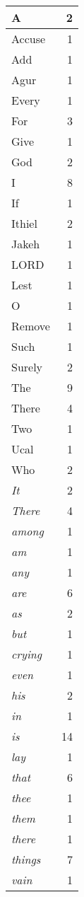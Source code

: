 \begin{center}
\begin{longtable}{l|r}
A & 2\\ \hline 
Accuse & 1\\ \hline 
Add & 1\\ \hline 
Agur & 1\\ \hline 
Every & 1\\ \hline 
For & 3\\ \hline 
Give & 1\\ \hline 
God & 2\\ \hline 
I & 8\\ \hline 
If & 1\\ \hline 
Ithiel & 2\\ \hline 
Jakeh & 1\\ \hline 
LORD & 1\\ \hline 
Lest & 1\\ \hline 
O & 1\\ \hline 
Remove & 1\\ \hline 
Such & 1\\ \hline 
Surely & 2\\ \hline 
The & 9\\ \hline 
There & 4\\ \hline 
Two & 1\\ \hline 
Ucal & 1\\ \hline 
Who & 2\\ \hline 
\emph{It} & 2\\ \hline 
\emph{There} & 4\\ \hline 
\emph{among} & 1\\ \hline 
\emph{am} & 1\\ \hline 
\emph{any} & 1\\ \hline 
\emph{are} & 6\\ \hline 
\emph{as} & 2\\ \hline 
\emph{but} & 1\\ \hline 
\emph{crying} & 1\\ \hline 
\emph{even} & 1\\ \hline 
\emph{his} & 2\\ \hline 
\emph{in} & 1\\ \hline 
\emph{is} & 14\\ \hline 
\emph{lay} & 1\\ \hline 
\emph{that} & 6\\ \hline 
\emph{thee} & 1\\ \hline 
\emph{them} & 1\\ \hline 
\emph{there} & 1\\ \hline 
\emph{things} & 7\\ \hline 
\emph{vain} & 1\\ \hline 

\end{longtable}
\end{center}
